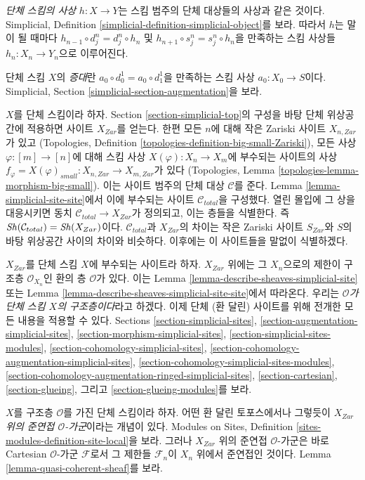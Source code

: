 \medskip\noindent
{\it 단체 스킴의 사상} $h : X \to Y$는 스킴 범주의 단체 대상들의 사상과
같은 것이다. Simplicial, Definition
\ref{simplicial-definition-simplicial-object}를 보라.
따라서 $h$는 말이 될 때마다
$h_{n - 1} \circ d^n_j = d^n_j \circ h_n$ 및
$h_{n + 1} \circ s^n_j = s^n_j \circ h_n$을 만족하는 스킴 사상들
$h_n : X_n \to Y_n$으로 이루어진다.

\medskip\noindent
단체 스킴 $X$의 {\it 증대}란
$a_0 \circ d^1_0 = a_0 \circ d^1_1$을 만족하는 스킴 사상
$a_0 : X_0 \to S$이다. Simplicial, Section
\ref{simplicial-section-augmentation}을 보라.

\medskip\noindent
$X$를 단체 스킴이라 하자. Section \ref{section-simplicial-top}의 구성을
바탕 단체 위상공간에 적용하면 사이트 $X_{Zar}$를 얻는다.
한편 모든 $n$에 대해 작은 Zariski 사이트 $X_{n, Zar}$가 있고
(Topologies, Definition \ref{topologies-definition-big-small-Zariski}),
모든 사상 $\varphi : [m] \to [n]$에 대해 스킴 사상
$X(\varphi) : X_n \to X_m$에 부수되는 사이트의 사상
$f_\varphi = X(\varphi)_{small} : X_{n, Zar} \to X_{m, Zar}$가 있다
(Topologies, Lemma \ref{topologies-lemma-morphism-big-small}).
이는 사이트 범주의 단체 대상 $\mathcal{C}$를 준다.
Lemma \ref{lemma-simplicial-site-site}에서 이에 부수되는 사이트
$\mathcal{C}_{total}$을 구성했다. 열린 몰입에 그 상을 대응시키면 동치
$\mathcal{C}_{total} \to X_{Zar}$가 정의되고, 이는 층들을 식별한다.
즉 $\mathop{\mathit{Sh}}\nolimits(\mathcal{C}_{total}) = \mathop{\mathit{Sh}}\nolimits(X_{Zar})$이다.
$\mathcal{C}_{total}$과 $X_{Zar}$의 차이는 작은 Zariski 사이트
$S_{Zar}$와 $S$의 바탕 위상공간 사이의 차이와 비슷하다.
이후에는 이 사이트들을 말없이 식별하겠다.

\medskip\noindent
$X_{Zar}$를 단체 스킴 $X$에 부수되는 사이트라 하자.
$X_{Zar}$ 위에는 그 $X_n$으로의 제한이 구조층
$\mathcal{O}_{X_n}$인 환의 층 $\mathcal{O}$가 있다. 이는 Lemma
\ref{lemma-describe-sheaves-simplicial-site} 또는 Lemma
\ref{lemma-describe-sheaves-simplicial-site-site}에서 따라온다.
우리는 {\it $\mathcal{O}$가 단체 스킴 $X$의 구조층이다}라고 하겠다.
이제 단체 (환 달린) 사이트를 위해 전개한 모든 내용을 적용할 수 있다.
Sections \ref{section-simplicial-sites},
\ref{section-augmentation-simplicial-sites},
\ref{section-morphism-simplicial-sites},
\ref{section-simplicial-sites-modules},
\ref{section-cohomology-simplicial-sites},
\ref{section-cohomology-augmentation-simplicial-sites},
\ref{section-cohomology-simplicial-sites-modules},
\ref{section-cohomology-augmentation-ringed-simplicial-sites},
\ref{section-cartesian},
\ref{section-glueing}, 그리고
\ref{section-glueing-modules}를 보라.

\medskip\noindent
$X$를 구조층 $\mathcal{O}$를 가진 단체 스킴이라 하자.
어떤 환 달린 토포스에서나 그렇듯이
{\it $X_{Zar}$ 위의 준연접 $\mathcal{O}$-가군}이라는 개념이 있다.
Modules on Sites, Definition \ref{sites-modules-definition-site-local}을 보라.
그러나 $X_{Zar}$ 위의 준연접 $\mathcal{O}$-가군은 바로 Cartesian
$\mathcal{O}$-가군 $\mathcal{F}$로서 그 제한들 $\mathcal{F}_n$이
$X_n$ 위에서 준연접인 것이다. Lemma
\ref{lemma-quasi-coherent-sheaf}를 보라.

